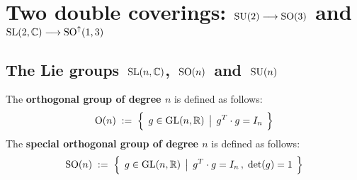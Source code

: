 

\chapter{Two double coverings: $\textnormal{SU}(2) \longrightarrow \textnormal{SO}(3)$ and $\textnormal{SL}(2,\mathbb{C}) \longrightarrow \textnormal{SO}^{\uparrow}(1,3)$}
\setcounter{theorem}{0}
\setcounter{equation}{0}


\renewcommand{\theenumi}{\roman{enumi}}
\renewcommand{\labelenumi}{\textnormal{(\theenumi)}$\;\;$}


\section{The Lie groups  \,$\textnormal{SL}(n,\mathbb{C})$,\, $\textnormal{SO}(n)$\, and \,$\textnormal{SU}(n)$}



\vskip 0.3cm
\begin{definition}
\mbox{}
\vskip 0.1cm
\noindent
The \textbf{orthogonal group of degree $n$} is defined as follows:
\begin{equation*}
\textnormal{O}(n)
\; := \;
	\left\{\;\,
		g \overset{{\color{white}.}}{\in} \textnormal{GL}(n,\Re)
		\;\left\vert\;\,
			g^{T} \cdot g = I_{n}
			\right.
		\;\right\}
\end{equation*}
The \textbf{special orthogonal group of degree $n$} is defined as follows:
\begin{equation*}
\textnormal{SO}(n)
\; := \;
	\left\{\;\,
		g \overset{{\color{white}.}}{\in} \textnormal{GL}(n,\Re)
		\;\left\vert\;\,
			g^{T} \cdot g = I_{n}\,,
			\;
			\textnormal{det}(g) = 1
			\right.
		\;\right\}
\end{equation*}
\end{definition}


